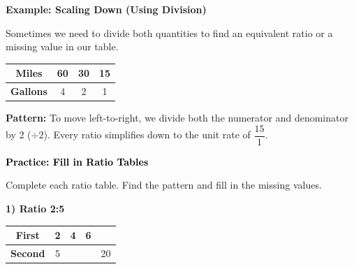 \documentclass[12pt, letterpaper, fleqn]{article}
\begin{document}
\vspace{1cm}

\begin{tcolorbox}[colback=white, colframe=black!25, boxrule=0.6pt, arc=4mm, left=6mm, right=6mm, top=5mm, bottom=5mm]

\textbf{Example: Scaling Down (Using Division)}

\noindent
Sometimes we need to divide both quantities to find an equivalent ratio or a missing value in our table.

\vspace{1cm}
\begin{center}
\begin{tabular}{|c|c|c|c|}
\hline
\textbf{Miles} & 60 & 30 & 15 \\
\hline
\textbf{Gallons} & 4 & 2 & 1 \\
\hline
\end{tabular}
\end{center}
\vspace{1cm}

\noindent
\textbf{Pattern:} To move left-to-right, we divide both the numerator and denominator by 2 ($\div 2$). Every ratio simplifies down to the unit rate of $\dfrac{15}{1}$.

\end{tcolorbox}

\vspace{4mm}
\newpage

\begin{tcolorbox}[colback=customteal!20]
\large\textcolor{black}{\textbf{Practice: Fill in Ratio Tables}}
\end{tcolorbox}

\noindent
Complete each ratio table. Find the pattern and fill in the missing values.

\vspace{3mm}

\noindent
\textbf{1) Ratio 2:5}

\begin{center}
\begin{tabular}{|c|c|c|c|c|}
\hline
\textbf{First} & 2 & 4 & 6 & \phantom{0} \\
\hline
\textbf{Second} & 5 & \phantom{0} & \phantom{0} & 20 \\
\hline
\end{tabular}
\end{center}
\end{document}
